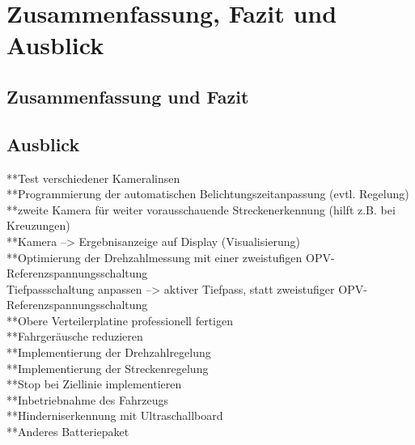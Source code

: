 

\pagestyle{fancy}
\rhead{\thepage} \chead{} 
\cfoot{}

\section{Zusammenfassung, Fazit und Ausblick}\label{Sec11}


\subsection{Zusammenfassung und Fazit}\label{Sec11Sub1}

\subsection{Ausblick}\label{Sec11Sub2}

**Test verschiedener Kameralinsen\\
**Programmierung der automatischen Belichtungszeitanpassung (evtl. Regelung)\\
**zweite Kamera für weiter vorausschauende Streckenerkennung (hilft z.B. bei Kreuzungen)\\
**Kamera --> Ergebnisanzeige auf Display (Visualisierung)\\

**Optimierung der Drehzahlmessung mit einer zweistufigen OPV-Referenzspannungsschaltung\\
Tiefpassschaltung anpassen --> aktiver Tiefpass, statt zweistufiger OPV-Referenzspannungsschaltung\\
**Obere Verteilerplatine professionell fertigen\\

**Fahrgeräusche reduzieren\\

**Implementierung der Drehzahlregelung\\
**Implementierung der Streckenregelung\\
**Stop bei Ziellinie implementieren\\
**Inbetriebnahme des Fahrzeugs\\

**Hinderniserkennung mit Ultraschallboard\\
**Anderes Batteriepaket\\




\newpage